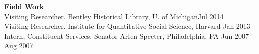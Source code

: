 \begin{minipage}{\linewidth}
{\large \textbf{Field Work}}\\
Visiting Researcher. Bentley Historical Library, U. of Michigan\hfill{Jul 2014}\\
Visiting Researcher. Institute for Quantitative Social Science, Harvard \hfill{Jan 2013}\\
Intern, Constituent Services. Senator Arlen Specter, Philadelphia, PA  \hfill{Jun 2007 – Aug 2007}%
\end{minipage}